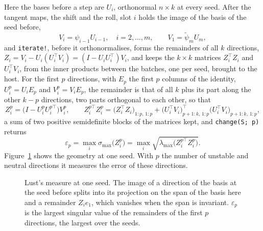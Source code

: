 \documentclass[11pt,a4paper]{article}
\newcommand{\code}[1]{\texttt{#1}}
\begin{document}
Here the bases before a step are $U_i$, orthonormal $n \times k$ at every seed. After the tangent
maps, the shift and the roll, slot $i$ holds the image of the basis of the seed before,
\begin{equation}
  V_i = \psi_{i-1} U_{i-1}, \quad i = 2, \dots, m, \qquad V_1 = \tilde\psi_m U_m ,
\end{equation}
and \code{iterate!}, before it orthonormalises, forms the remainders of all $k$ directions,
$Z_i = V_i - U_i (U_i^{\!\top} V_i) = (I - U_iU_i^{\!\top}) V_i$, and keeps the $k \times k$ matrices
$Z_i^{\!\top} Z_i$ and $U_i^{\!\top} V_i$, from the inner products between the batches, one per seed,
brought to the host. For the first $p$ directions, with $E_p$ the first $p$ columns of the
identity, $U_i^p = U_i E_p$ and $V_i^p = V_i E_p$, the remainder is that of all $k$ plus its part
along the other $k - p$ directions, two parts orthogonal to each other, so that
\begin{equation}
  Z_i^p = \big(I - U_i^p U_i^{p\top}\big) V_i^p, \qquad
  Z_i^{p\top} Z_i^p = \big(Z_i^{\!\top} Z_i\big)_{1:p,\,1:p}
                    + \big(U_i^{\!\top} V_i\big)_{p+1:k,\,1:p}^{\!\top} \big(U_i^{\!\top} V_i\big)_{p+1:k,\,1:p} ,
\end{equation}
a sum of two positive semidefinite blocks of the matrices kept, and \code{change(S; p)} returns
\begin{equation}
  \varepsilon_p = \max_i \sigma_{\max}\big(Z_i^p\big)
                = \max_i \sqrt{\lambda_{\max}\big(Z_i^{p\top} Z_i^p\big)} .
\end{equation}
Figure~\ref{fig:lust} shows the geometry at one seed. With $p$ the number of unstable and neutral
directions it measures the error of these directions.

\begin{figure}
  \centering
  \caption{Lust's measure at one seed. The image of a direction of the basis at the seed before
  splits into its projection on the span of the basis here and a remainder $Z_i e_1$, which
  vanishes when the span is invariant. $\varepsilon_p$ is the largest singular value of the
  remainders of the first $p$ directions, the largest over the seeds.}
  \label{fig:lust}
\end{figure}
\end{document}
